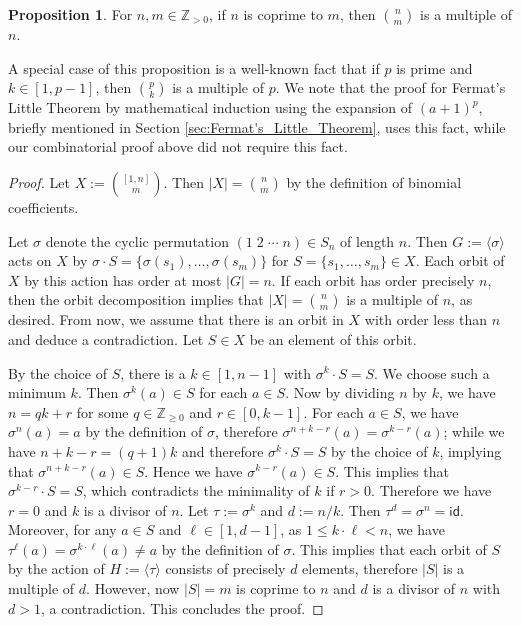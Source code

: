 ﻿\documentclass{article}
\theoremstyle{definition}
\newtheorem{proposition}{Proposition}
\begin{document}
\begin{proposition}
    \label{prop:binomial_divisible_by_n}
    For $n,m \in \mathbb{Z}_{>0}$, if $n$ is coprime to $m$, then $\binom{n}{m}$ is a multiple of $n$.
\end{proposition}

A special case of this proposition is a well-known fact that if $p$ is prime and $k \in [1,p-1]$, then $\binom{p}{k}$ is a multiple of $p$.
We note that the proof for Fermat's Little Theorem by mathematical induction using the expansion of $(a+1)^p$, briefly mentioned in Section \ref{sec:Fermat's_Little_Theorem}, uses this fact, while our combinatorial proof above did not require this fact.

\begin{proof}
    Let $X := \binom{[1,n]}{m}$.
    Then $|X| = \binom{n}{m}$ by the definition of binomial coefficients.

    Let $\sigma$ denote the cyclic permutation $(1\;2\;\cdots\;n) \in S_n$ of length $n$.
    Then $G := \langle \sigma \rangle$ acts on $X$ by $\sigma \cdot S = \{ \sigma(s_1),\dots,\sigma(s_m) \}$ for $S = \{s_1,\dots,s_m\} \in X$.
    Each orbit of $X$ by this action has order at most $|G| = n$.
    If each orbit has order precisely $n$, then the orbit decomposition implies that $|X| = \binom{n}{m}$ is a multiple of $n$, as desired.
    From now, we assume that there is an orbit in $X$ with order less than $n$ and deduce a contradiction.
    Let $S \in X$ be an element of this orbit.

    By the choice of $S$, there is a $k \in [1,n-1]$ with $\sigma^k \cdot S = S$.
    We choose such a minimum $k$.
    Then $\sigma^k(a) \in S$ for each $a \in S$.
    Now by dividing $n$ by $k$, we have $n = qk + r$ for some $q \in \mathbb{Z}_{\geq 0}$ and $r \in [0,k-1]$.
    For each $a \in S$, we have $\sigma^n(a) = a$ by the definition of $\sigma$, therefore $\sigma^{n+k-r}(a) = \sigma^{k-r}(a)$; while we have $n + k - r = (q+1)k$ and therefore $\sigma^k \cdot S = S$ by the choice of $k$, implying that $\sigma^{n+k-r}(a) \in S$.
    Hence we have $\sigma^{k-r}(a) \in S$.
    This implies that $\sigma^{k-r} \cdot S = S$, which contradicts the minimality of $k$ if $r > 0$.
    Therefore we have $r = 0$ and $k$ is a divisor of $n$.
    Let $\tau := \sigma^k$ and $d := n/k$.
    Then $\tau^d = \sigma^n = \mathsf{id}$.
    Moreover, for any $a \in S$ and $\ell \in [1,d-1]$, as $1 \leq k \cdot \ell < n$, we have $\tau^{\ell}(a) = \sigma^{k \cdot \ell}(a) \neq a$ by the definition of $\sigma$.
    This implies that each orbit of $S$ by the action of $H := \langle \tau \rangle$ consists of precisely $d$ elements, therefore $|S|$ is a multiple of $d$.
    However, now $|S| = m$ is coprime to $n$ and $d$ is a divisor of $n$ with $d > 1$, a contradiction.
    This concludes the proof.
\end{proof}
\end{document}
